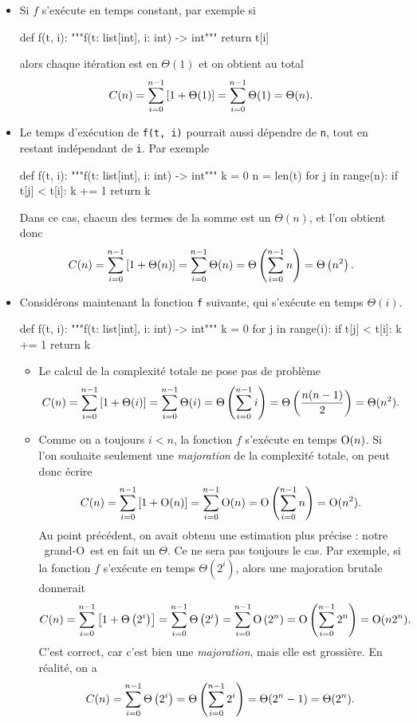 \documentclass{magnolia}
\begin{document}
\begin{itemize}
  \item Si $f$ s'exécute en temps constant,
  par exemple si
\begin{pythoncodeline}
def f(t, i):
    """f(t: list[int], i: int) -> int"""
    return t[i]
\end{pythoncodeline}
  alors chaque itération est en
  $\Theta(1)$ et on obtient au total
  \[C(n)=\sum_{i=0}^{n-1} \left[1+\Theta(1)\right]=\sum_{i=0}^{n-1} \Theta(1)=\Theta(n).\]
  \item Le temps d'exécution de \verb!f(t, i)! pourrait aussi dépendre de \verb!n!,
  tout en restant indépendant de \verb!i!. Par exemple
\begin{pythoncodeline}
def f(t, i):
    """f(t: list[int], i: int) -> int"""
    k = 0
    n = len(t)
    for j in range(n):
        if t[j] < t[i]:
            k += 1
    return k
\end{pythoncodeline}
  Dans ce cas, chacun des termes de la somme  est un $\Theta(n)$,
  et l'on obtient donc
  \[C(n)=\sum_{i = 0}^{n - 1} \left[1 + \Theta(n)\right]
        =\sum_{i = 0}^{n - 1} \Theta(n)
        =\Theta\left(\sum_{i=0}^{n-1} n\right)=\Theta\left(n^2\right).\]
  \item Considérons maintenant la fonction \verb!f! suivante, qui s'exécute en
  temps $\Theta(i)$.
\begin{pythoncodeline}
def f(t, i):
    """f(t: list[int], i: int) -> int"""
    k = 0
    for j in range(i):
        if t[j] < t[i]:
            k += 1
    return k
\end{pythoncodeline}
  \begin{itemize}
    \item Le calcul de la complexité totale ne pose pas de problème
    \[
     C(n)=\sum_{i = 0}^{n - 1} \left[1+\Theta(i)\right]
         =\sum_{i = 0}^{n - 1} \Theta(i)
         =\Theta\left(\sum_{i = 0}^{n - 1} i\right)
         =\Theta\left(\frac{n(n - 1)}{2}\right)
         =\Theta(n^2).
    \]

    \item Comme on a toujours $i < n$, la fonction $f$ s'exécute en temps
    ${\rm O}(n)$. Si l'on souhaite seulement une \emph{majoration} de la
    complexité totale, on peut donc écrire
    \[
      C(n)=\sum_{i = 0}^{n - 1} \left[1+{\rm O}(n)\right]
      =\sum_{i = 0}^{n - 1} {\rm O}(n)
      ={\rm O}\left(\sum_{i = 0}^{n - 1} n\right)
      = {\rm O}(n^2).
    \]
    Au point précédent, on avait obtenu une estimation plus précise : notre \og~grand-O~\fg est en fait
    un $\Theta$.
Ce ne sera pas toujours le cas. Par exemple, si la fonction $f$
  s'exécute en temps $\Theta(2^i)$, alors une majoration brutale donnerait
  \[
    C(n)=\sum_{i = 0}^{n - 1} \left[1+\Theta\left(2^i\right)\right]
    =\sum_{i = 0}^{n - 1} \Theta\left(2^i\right)
    =\sum_{i = 0}^{n - 1} {\rm O}\left(2^n\right)
    ={\rm O}\left(\sum_{i = 0}^{n - 1} 2^n\right)
    = {\rm O}(n2^n).
  \]
  C'est correct, car c'est bien une \emph{majoration}, mais elle est grossière. En
  réalité, on a
  \[
    C(n)
    =\sum_{i = 0}^{n - 1} \Theta\left(2^i\right)
    =\Theta\left(\sum_{i=0}^{n-1} 2^i\right)
    =\Theta(2^n - 1)
    = \Theta(2^n).
  \]
\end{itemize}
\end{itemize}
\end{document}
